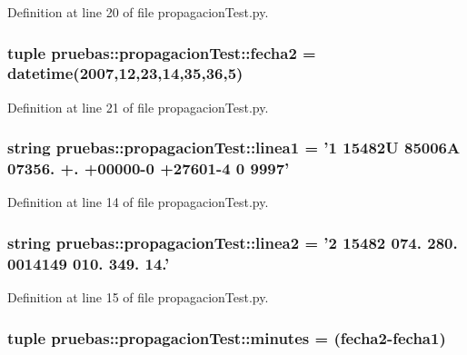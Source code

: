 \-Definition at line 20 of file propagacion\-Test.\-py.

\subsubsection[{fecha2}]{\setlength{\rightskip}{0pt plus 5cm}tuple {\bf pruebas\-::propagacion\-Test\-::fecha2} = datetime(2007,12,23,14,35,36,5)}\label{namespacepruebas_1_1propagacion_test_a32120410248a881a53128b29fbfd97e0}


\-Definition at line 21 of file propagacion\-Test.\-py.

\subsubsection[{linea1}]{\setlength{\rightskip}{0pt plus 5cm}string {\bf pruebas\-::propagacion\-Test\-::linea1} = '1 15482\-U 85006\-A 07356. +. +00000-\/0 +27601-\/4 0 9997'}\label{namespacepruebas_1_1propagacion_test_a16c7451b84b5cba1c298217e2d0f9925}


\-Definition at line 14 of file propagacion\-Test.\-py.

\subsubsection[{linea2}]{\setlength{\rightskip}{0pt plus 5cm}string {\bf pruebas\-::propagacion\-Test\-::linea2} = '2 15482 074. 280. 0014149 010. 349. 14.'}\label{namespacepruebas_1_1propagacion_test_a1045e064a443533b6ee82494aa5799bf}


\-Definition at line 15 of file propagacion\-Test.\-py.

\subsubsection[{minutes}]{\setlength{\rightskip}{0pt plus 5cm}tuple {\bf pruebas\-::propagacion\-Test\-::minutes} = ({\bf fecha2}-\/{\bf fecha1})}\label{namespacepruebas_1_1propagacion_test_a13afa02378a67b9e0e236c2f8cb3186e}


